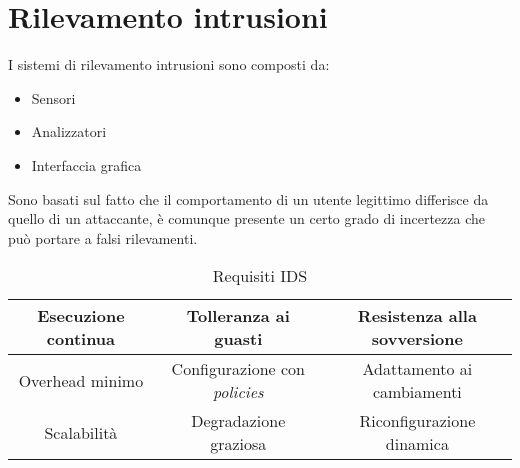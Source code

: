 \documentclass{article}
\begin{document}
\section{Rilevamento intrusioni}

I sistemi di rilevamento intrusioni sono composti da:
\begin{itemize}
    \item Sensori
    \item Analizzatori
    \item Interfaccia grafica\newline
\end{itemize}

\noindent Sono basati sul fatto che il comportamento di un utente legittimo differisce da quello di un attaccante, è comunque presente un certo grado di incertezza che può portare a falsi rilevamenti.\newline

\begin{table}[ht]
    \centering
    \begin{tabular}{c|c|c}
        Esecuzione continua & Tolleranza ai guasti & Resistenza alla sovversione\\
         \hline
        Overhead minimo & Configurazione con \textit{policies} & Adattamento ai cambiamenti\\
         \hline
        Scalabilità & Degradazione graziosa & Riconfigurazione dinamica\\
    \end{tabular}
    \caption{Requisiti IDS}
\end{table}
\end{document}
